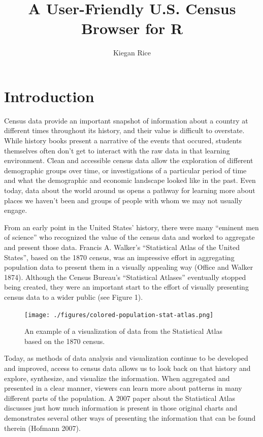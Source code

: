 \documentclass[11pt,]{article}
\title{A User-Friendly U.S. Census Browser for R}
\author{Kiegan Rice}
\date{}
\begin{document}
\maketitle

\section{Introduction}

Census data provide an important snapshot of information about a country
at different times throughout its history, and their value is difficult
to overstate. While history books present a narrative of the events that
occured, students themselves often don't get to interact with the raw
data in that learning environment. Clean and accessible census data
allow the exploration of different demographic groups over time, or
investigations of a particular period of time and what the demographic
and economic landscape looked like in the past. Even today, data about
the world around us opens a pathway for learning more about places we
haven't been and groups of people with whom we may not usually engage.

From an early point in the United States' history, there were many
``eminent men of science'' who recognized the value of the census data
and worked to aggregate and present those data. Francis A. Walker's
``Statistical Atlas of the United States'', based on the 1870 census,
was an impressive effort in aggregating population data to present them
in a visually appealing way (Office and Walker 1874). Although the
Census Bureau's ``Statistical Atlases'' eventually stopped being
created, they were an important start to the effort of visually
presenting census data to a wider public (see Figure 1).

\begin{figure}[htbp]
\centering
\texttt{[image: ./figures/colored-population-stat-atlas.png]}
\caption{An example of a visualization of data from the Statistical
Atlas based on the 1870 census.}
\end{figure}

Today, as methods of data analysis and visualization continue to be
developed and improved, access to census data allows us to look back on
that history and explore, synthesize, and visualize the information.
When aggregated and presented in a clear manner, viewers can learn more
about patterns in many different parts of the population. A 2007 paper
about the Statistical Atlas discusses just how much information is
present in those original charts and demonstrates several other ways of
presenting the information that can be found therein (Hofmann 2007).
\end{document}
